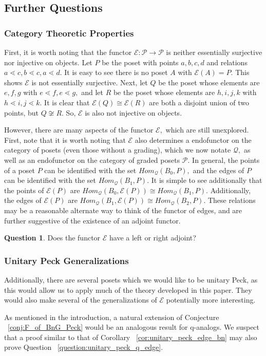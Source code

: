 \documentclass[10 pt]{amsart}
\theoremstyle{plain}
\theoremstyle{definition}
\newtheorem{question}[thm]{Question}
\theoremstyle{remark}
\numberwithin{equation}{section}
\newcommand\ssec{\subsection}
\newcommand\sssec{\subsubsection}
\begin{document}
\ssec{Further Questions}

\sssec{Category Theoretic Properties}

First, it is worth noting that the functor $\mathcal E:\mathcal P \rightarrow \mathcal P$ is neither essentially surjective nor injective on objects. Let $P$ be the poset with points $a,b,c,d$ and relations $a \lessdot c, b \lessdot c, a \lessdot d.$ It is easy to see there is no poset $A$ with $\mathcal E(A) = P.$ This shows $\mathcal E$ is not essentially surjective. Next, let $Q$ be the poset whose elements are $e,f,g$ with $e \lessdot f, e \lessdot g,$ and let $R$ be the poset whose elements are $h,i,j,k$ with $h \lessdot i, j \lessdot k.$ It is clear that $\mathcal E(Q) \cong \mathcal E(R)$ are both a disjoint union of two points, but $Q \not \cong R.$ So, $\mathcal E$ is also not injective on objects.

However, there are many aspects of the functor $\mathcal E,$ which are still unexplored. First, note that it is worth noting that $\mathcal E$ also determines a endofunctor on the category of posets (even those without a grading), which we now notate $\mathcal Q,$ as well as an endofunctor on the category of graded posets $\mathcal P.$ In general, the points of a poset $P$ can be identified with the set $Hom_{\mathcal Q}(B_0,P),$ and the edges of $P$ can be identified with the set $Hom_{\mathcal Q}(B_1,P).$ It is simple to see additionally that the points of $\mathcal E(P)$ are $Hom_{\mathcal Q}(B_0,\mathcal E(P)) \cong Hom_{\mathcal Q}(B_1,P).$ Additionally, the edges of $\mathcal E(P)$ are $Hom_{\mathcal Q}(B_1,\mathcal E(P)) \cong Hom_{\mathcal Q}(B_2,P).$ These relations may be a reasonable alternate way to think of the functor of edges, and are further suggestive of the existence of an adjoint functor.

\begin{question}
Does the functor $\mathcal E$ have a left or right adjoint?
\end{question}

\sssec{Unitary Peck Generalizations}

Additionally, there are several posets which we would like to be unitary  
Peck, as this would allow us to apply much of the theory developed in this paper. They would also make several of the generalizations of $\mathcal E$ potentially more interesting.

As mentioned in the introduction, a natural extension of Conjecture ~\ref{conj:F_of_BnG_Peck} would be an analogous result for q-analogs. We suspect that a proof similar to that of Corollary ~\ref{cor:unitary_peck_edge_bn} may also prove Question ~\ref{question:unitary_peck_q_edge}.
\end{document}
